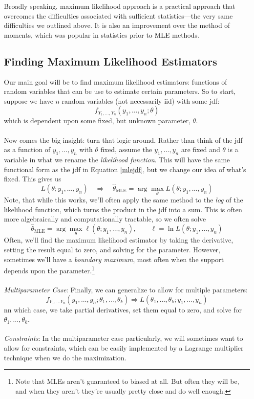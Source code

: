 \documentclass[a4paper,12pt]{scrartcl}
\begin{document}
Broadly speaking, maximum likelihood approach is a practical approach
that overcomes the difficulties associated with sufficient
statistics---the very same difficulties we outlined above. It is also
an improvement over the method of moments, which was popular in
statistics prior to MLE methods.


\subsection{Finding Maximum Likelihood Estimators}

Our main goal will be to find maximum likelihood estimators: functions
of random variables that can be use to estimate certain parameters.
So to start, suppose we have $n$ random variables (not necessarily
iid) with some jdf:
\begin{equation}
   \label{mlejdf}
    f_{Y_1, \ldots, Y_n}(y_1, \ldots, y_n; \theta)
\end{equation}
which is dependent upon some fixed, but unknown parameter, $\theta$.
\\
\\
Now comes the big insight: turn that logic around. Rather than think
of the jdf as a function of $y_1, \ldots, y_n$ with $\theta$ fixed,
assume the $y_1, \ldots, y_n$ are fixed and $\theta$ is a variable
in what we rename the \emph{likelihood function}.
This will have the same functional form as the jdf in Equation
\ref{mlejdf}, but we change our idea of what's fixed. This gives us
\begin{equation}
   \label{mlelik}
    L(\theta; y_1, \ldots, y_n) \quad\Rightarrow \quad
    \hat{\theta}_{\text{MLE}} =
   \arg \max_\theta L(\theta; y_1, \ldots, y_n)
\end{equation}
Note, that while this works, we'll often apply the same method to
the \emph{log} of the likelihood function, which turns the product
in the jdf into a sum. This is often more algebraically and
computationally tractable, so we often solve
\[ \hat{\theta}_{\text{MLE}}  =
   \arg \max_\theta \ell(\theta; y_1, \ldots, y_n),
   \qquad \ell = \ln L(\theta; y_1, \ldots, y_n)  \]
Often, we'll find the maximum likelihood estimator by taking the
derivative, setting the result equal to zero, and solving for the
parameter. However, sometimes we'll have a \emph{boundary maximum},
most often when the support depends upon the parameter.\footnote{
Note that MLEs aren't guaranteed to biased at all. But often they will
be, and when they aren't they're usually pretty close and do
well enough.}
\\
\\
{\sl Multiparameter Case}: Finally, we can generalize to
allow for multiple parameters:
   \[ f_{Y_1, \ldots Y_n}(y_1, \ldots, y_n; \theta_1, \ldots, \theta_k)
      \Rightarrow
      L(\theta_1, \ldots, \theta_k; y_1, \ldots, y_n )
      \]
nn which case, we take partial derivatives, set them equal to zero,
and solve for $\theta_1, \ldots, \theta_k$.
\\
\\
{\sl Constraints}: In the multiparameter case particularly, we will
sometimes want to allow for constraints, which can be easily
implemented by a Lagrange multiplier technique when we do the
maximization.
\end{document}
